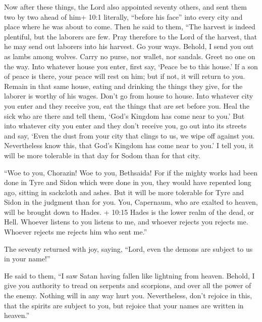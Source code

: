  Now after these things, the Lord also appointed seventy
others, and sent them two by two ahead of him+ 10:1 literally, ``before
his face'' into every city and place where he was about to come.
 Then he said to them, ``The harvest is indeed plentiful,
but the laborers are few. Pray therefore to the Lord of the harvest,
that he may send out laborers into his harvest.  Go your
ways. Behold, I send you out as lambs among wolves.  Carry
no purse, nor wallet, nor sandals. Greet no one on the way. 
Into whatever house you enter, first say, `Peace be to this house.'
 If a son of peace is there, your peace will rest on him;
but if not, it will return to you.  Remain in that same
house, eating and drinking the things they give, for the laborer is
worthy of his wages. Don't go from house to house.  Into
whatever city you enter and they receive you, eat the things that are
set before you.  Heal the sick who are there and tell them,
`God's Kingdom has come near to you.'  But into whatever
city you enter and they don't receive you, go out into its streets and
say,  `Even the dust from your city that clings to us, we
wipe off against you. Nevertheless know this, that God's Kingdom has
come near to you.'  I tell you, it will be more tolerable
in that day for Sodom than for that city.

 ``Woe to you, Chorazin! Woe to you, Bethsaida! For if the
mighty works had been done in Tyre and Sidon which were done in you,
they would have repented long ago, sitting in sackcloth and ashes.
 But it will be more tolerable for Tyre and Sidon in the
judgment than for you.  You, Capernaum, who are exalted to
heaven, will be brought down to Hades. + 10:15 Hades is the lower realm
of the dead, or Hell.  Whoever listens to you listens to
me, and whoever rejects you rejects me. Whoever rejects me rejects him
who sent me.''

 The seventy returned with joy, saying, ``Lord, even the
demons are subject to us in your name!''

 He said to them, ``I saw Satan having fallen like
lightning from heaven.  Behold, I give you authority to
tread on serpents and scorpions, and over all the power of the enemy.
Nothing will in any way hurt you.  Nevertheless, don't
rejoice in this, that the spirits are subject to you, but rejoice that
your names are written in heaven.''

